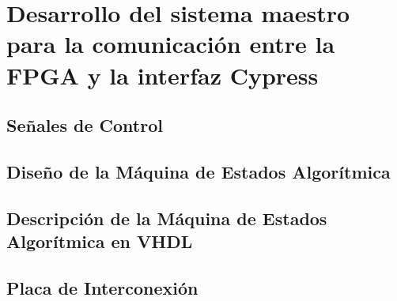 \chapter{Desarrollo del sistema maestro para la comunicación entre la FPGA y la interfaz Cypress}
	\label{cap:fpga}
	
%		
	\section{Señales de Control}
		
	\section{Diseño de la Máquina de Estados Algorítmica}
		
	\section{Descripción de la Máquina de Estados Algorítmica en VHDL}
		
	\section{Placa de Interconexión}
		